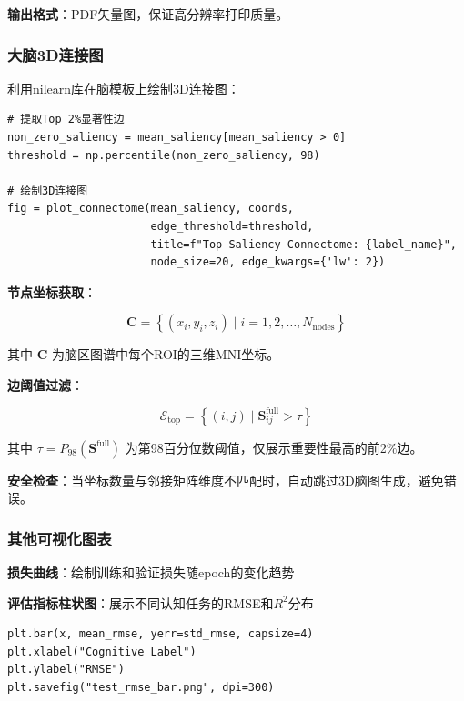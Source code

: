 \textbf{输出格式}：PDF矢量图，保证高分辨率打印质量。

\subsubsection{大脑3D连接图}

利用nilearn库在脑模板上绘制3D连接图：

\begin{verbatim}
# 提取Top 2%显著性边
non_zero_saliency = mean_saliency[mean_saliency > 0]
threshold = np.percentile(non_zero_saliency, 98)

# 绘制3D连接图
fig = plot_connectome(mean_saliency, coords, 
                      edge_threshold=threshold,
                      title=f"Top Saliency Connectome: {label_name}",
                      node_size=20, edge_kwargs={'lw': 2})
\end{verbatim}

\textbf{节点坐标获取}：

\begin{equation}
\mathbf{C} = \left\{ (x_i, y_i, z_i) \mid i = 1, 2, \ldots, N_{\text{nodes}} \right\}
\end{equation}

其中 $\mathbf{C}$ 为脑区图谱中每个ROI的三维MNI坐标。

\textbf{边阈值过滤}：

\begin{equation}
\mathcal{E}_{\text{top}} = \left\{ (i,j) \mid \mathbf{S}^{\text{full}}_{ij} > \tau \right\}
\end{equation}

其中 $\tau = P_{98}(\mathbf{S}^{\text{full}})$ 为第98百分位数阈值，仅展示重要性最高的前2\%边。

\textbf{安全检查}：当坐标数量与邻接矩阵维度不匹配时，自动跳过3D脑图生成，避免错误。

\subsubsection{其他可视化图表}

\textbf{损失曲线}：绘制训练和验证损失随epoch的变化趋势

\textbf{评估指标柱状图}：展示不同认知任务的RMSE和$R^2$分布

\begin{verbatim}
plt.bar(x, mean_rmse, yerr=std_rmse, capsize=4)
plt.xlabel("Cognitive Label")
plt.ylabel("RMSE")
plt.savefig("test_rmse_bar.png", dpi=300)
\end{verbatim}

